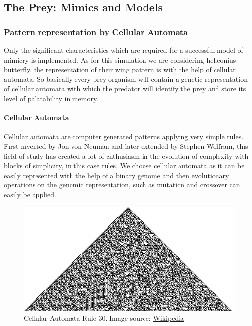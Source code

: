 \documentclass[letterpaper]{article}
\numberwithin{equation}{section}
\begin{document}
\subsection{The Prey: Mimics and Models}

\subsubsection{Pattern representation by Cellular Automata}
Only the significant characteristics which are required for a successful model of mimicry is implemented. As for this simulation we are considering heliconius butterfly, the representation of their wing pattern is with the help of cellular automata. So basically every prey organism will contain a genetic representation of cellular automata with which the predator will identify the prey and store its level of palatability in memory.

\paragraph{Cellular Automata}

Cellular automata are computer generated patterns applying very simple rules. First invented by Jon von Neuman and later extended by Stephen Wolfram, this field of study has created a lot of enthusiasm in the evolution of complexity with blocks of simplicity, in this case rules. We choose cellular automata as it can be easily represented with the help of a binary genome and then evolutionary operations on the genomic representation, such as mutation and crossover can easily be applied.

\begin{figure}[H]
	\centering
	\includegraphics[scale=5]{../tex/images/CA_rule30s}
	\caption[Cellular Automata]{Cellular Automata Rule 30.
	Image source: \href{http://en.wikipedia.org/wiki/Cellular_automata}{Wikipedia}}
	\label{fig:cellular-automata-rule-30}
\end{figure}
\end{document}
